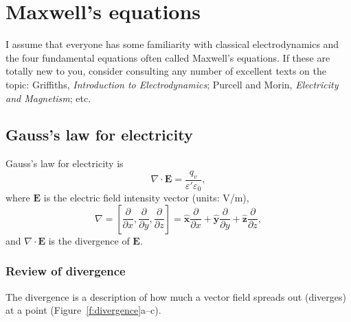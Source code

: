 \documentclass[11pt, oneside]{article}
\begin{document}
\section{Maxwell's equations}

I assume that everyone has some familiarity with classical electrodynamics and the four fundamental equations often called Maxwell's equations. If these are totally new to you, consider consulting any number of excellent texts on the topic: Griffiths, \emph{Introduction to Electrodynamics}; Purcell and Morin, \emph{Electricity and Magnetism}; etc.

\subsection{Gauss's law for electricity}

Gauss's law for electricity is
\begin{equation}
	\label{e:gauss_e}
	\nabla\cdot\mathbf{E} = \frac{q_v}{\varepsilon'\varepsilon_0},
\end{equation}
where $\mathbf{E}$ is the electric field intensity vector (units: V/m),
\begin{equation}
	\nabla = \left[\frac{\partial}{\partial x}, \frac{\partial}{\partial y}, \frac{\partial}{\partial z}\right] = \hat{\mathbf{x}}\frac{\partial}{\partial x} + \hat{\mathbf{y}}\frac{\partial}{\partial y} + \hat{\mathbf{z}}\frac{\partial}{\partial z},
\end{equation}
and $\nabla\cdot\mathbf{E}$ is the divergence of $\mathbf{E}$.

\subsubsection{Review of divergence}

The divergence is a description of how much a vector field spreads out (diverges) at a point (Figure~\ref{f:divergence}a--c).
\end{document}
